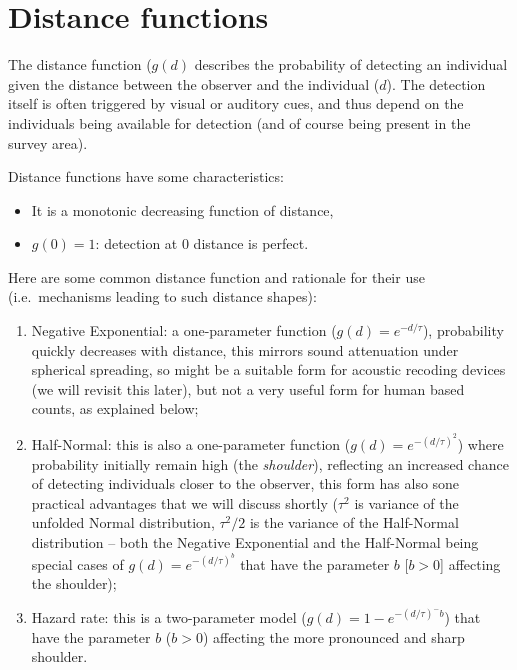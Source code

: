 \documentclass[12pt,]{book}
\providecommand{\tightlist}{%
  \setlength{\itemsep}{0pt}\setlength{\parskip}{0pt}}
\begin{document}
\hypertarget{distance-functions}{%
\section{Distance functions}\label{distance-functions}}

The distance function (\(g(d)\) describes the probability of detecting an individual
given the distance between the observer and the individual (\(d\)).
The detection itself is often triggered by visual or auditory cues,
and thus depend on the individuals being available for detection
(and of course being present in the survey area).

Distance functions have some characteristics:

\begin{itemize}
\tightlist
\item
  It is a monotonic decreasing function of distance,
\item
  \(g(0)=1\): detection at 0 distance is perfect.
\end{itemize}

Here are some common distance function and rationale for their use
(i.e.~mechanisms leading to such distance shapes):

\begin{enumerate}
\def\labelenumi{\arabic{enumi}.}
\tightlist
\item
  Negative Exponential: a one-parameter function (\(g(d) = e^{-d/\tau}\)), probability quickly decreases with distance, this mirrors sound attenuation under spherical spreading, so might be a suitable form for acoustic recoding devices (we will revisit this later), but not a very useful form for human based counts, as explained below;
\item
  Half-Normal: this is also a one-parameter function (\(g(d) = e^{-(d/\tau)^2}\)) where probability initially remain high (the \emph{shoulder}), reflecting an increased chance of detecting individuals closer to the observer, this form has also sone practical advantages that we will discuss shortly (\(\tau^2\) is variance of the unfolded Normal distribution, \(\tau^2/2\) is the variance of the Half-Normal distribution -- both the Negative Exponential and the Half-Normal being special cases of \(g(d) = e^{-(d/\tau)^b}\) that have the parameter \(b\) {[}\(b > 0\){]} affecting the shoulder);
\item
  Hazard rate: this is a two-parameter model (\(g(d) = 1-e^{-(d/\tau)^-b}\)) that have the parameter \(b\) (\(b > 0\)) affecting the more pronounced and sharp shoulder.
\end{enumerate}
\end{document}
